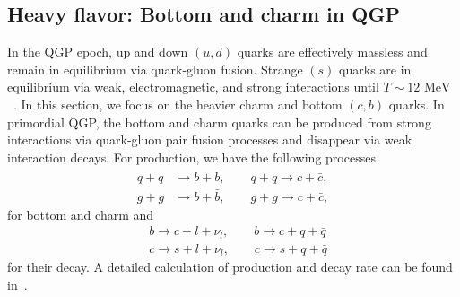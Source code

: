 \documentclass[universe,article,submit,moreauthors,pdftex,a4paper]{Definitions/mdpi}
\newcommand{\MeV}{\text{ MeV}}
\begin{document}
\subsection{Heavy flavor: Bottom and charm in QGP}\label{BottomCharm}
\noindent In the QGP epoch, up and down $(u,d)$ quarks are effectively massless and remain in equilibrium via quark-gluon fusion. Strange $(s)$ quarks are in equilibrium via weak, electromagnetic, and strong interactions until $T\sim12\MeV$~\cite{Yang:2021bko}. In this section, we focus on the heavier charm and bottom $(c,b)$ quarks. In primordial QGP, the bottom and charm quarks can be produced from strong interactions via quark-gluon pair fusion processes and disappear via weak interaction decays. For production, we have the following processes
\begin{align}
 q+q&\longrightarrow b+\bar b,\qquad q+q\longrightarrow c+\bar c,\\
 g+g&\longrightarrow b+\bar b,\qquad g+g\longrightarrow c+\bar c,
\end{align}
for bottom and charm and 
\begin{align}
 &b\longrightarrow c+l+\nu_l, \qquad b\longrightarrow c+q+\bar{q}\\
&c\longrightarrow s+l+\nu_l,\qquad c\longrightarrow s+q+\bar{q}
\end{align}
for their decay. A detailed calculation of production and decay rate can be found in~\cite{Yang:2020nne,Yang:2023bot}.
\end{document}
